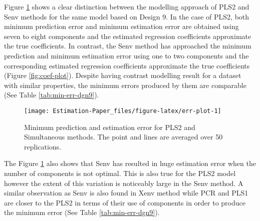 \documentclass[12pt,3p,authoryear]{elsarticle}
\begin{document}
Figure \ref{fig:err-plot} shows a clear distinction between the
modelling approach of PLS2 and Senv methods for the same model based on
Design 9. In the case of PLS2, both minimum prediction error and minimum
estimation error are obtained using seven to eight components and the
estimated regression coefficients approximate the true coefficients. In
contrast, the Senv method has approached the minimum prediction and
minimum estimation error using one to two components and the
corresponding estimated regression coefficients approximate the true
coefficients (Figure \ref{fig:coef-plot}). Despite having contrast
modelling result for a dataset with similar properties, the minimum
errors produced by them are comparable (See Table
\ref{tab:min-err-dgn9}).

\begin{figure}
\texttt{[image: Estimation-Paper\_files/figure-latex/err-plot-1]} \caption{Minimum prediction and estimation error for PLS2 and Simultaneous methods. The point and lines are averaged over 50 replications.}\label{fig:err-plot}
\end{figure}

The Figure \ref{fig:err-plot} also shows that Senv has resulted in huge
estimation error when the number of components is not optimal. This is
also true for the PLS2 model however the extent of this variation is
noticeably large in the Senv method. A similar observation as Senv is
also found in Xenv method while PCR and PLS1 are closer to the PLS2 in
terms of their use of components in order to produce the minimum error
(See Table \ref{tab:min-err-dgn9}).
\end{document}
